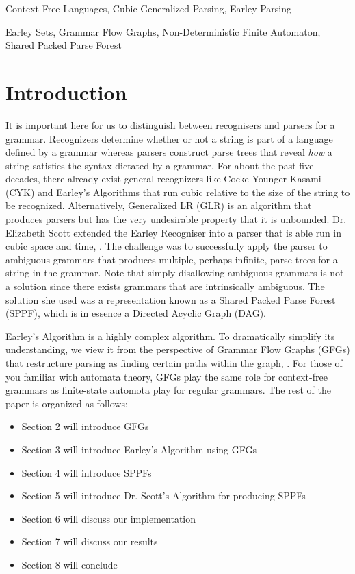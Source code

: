 \documentclass{sigplanconf}
\begin{document}

\terms
Context-Free Languages, Cubic Generalized Parsing, Earley Parsing 

\keywords
Earley Sets, Grammar Flow Graphs, Non-Deterministic Finite Automaton, Shared Packed Parse Forest

\section{Introduction}
It is important here for us to distinguish between recognisers and parsers for a grammar. Recognizers determine whether or not a string is part of a language defined by a grammar whereas parsers construct parse trees that reveal \textit{how} a string satisfies the syntax dictated by a grammar. For about the past five decades, there already exist general recognizers like Cocke-Younger-Kasami (CYK) and Earley's Algorithms that run cubic relative to the size of the string to be recognized. Alternatively, Generalized LR (GLR) is an algorithm that produces parsers but has the very undesirable property that it is unbounded. Dr. Elizabeth Scott extended the Earley Recogniser into a parser that is able run in cubic space and time, \cite{scott}. The challenge was to successfully apply the parser to ambiguous grammars that produces multiple, perhaps infinite, parse trees for a string in the grammar. Note that simply disallowing ambiguous grammars is not a solution since there exists grammars that are intrinsically ambiguous. The solution she used was a representation known as a Shared Packed Parse Forest (SPPF), which is in essence a Directed Acyclic Graph (DAG).

Earley's Algorithm is a highly complex algorithm. To dramatically simplify its understanding, we view it from the perspective of Grammar Flow Graphs (GFGs) that restructure parsing as finding certain paths within the graph, \cite{bilardi-pingali}. For those of you familiar with automata theory, GFGs play the same role for context-free grammars as finite-state automota play for regular grammars. The rest of the paper is organized as follows:
\begin{itemize}
\item Section 2 will introduce GFGs
\item Section 3 will introduce Earley's Algorithm using GFGs
\item Section 4 will introduce SPPFs
\item Section 5 will introduce Dr. Scott's Algorithm for producing SPPFs
\item Section 6 will discuss our implementation
\item Section 7 will discuss our results
\item Section 8 will conclude
\end{itemize}
\end{document}
